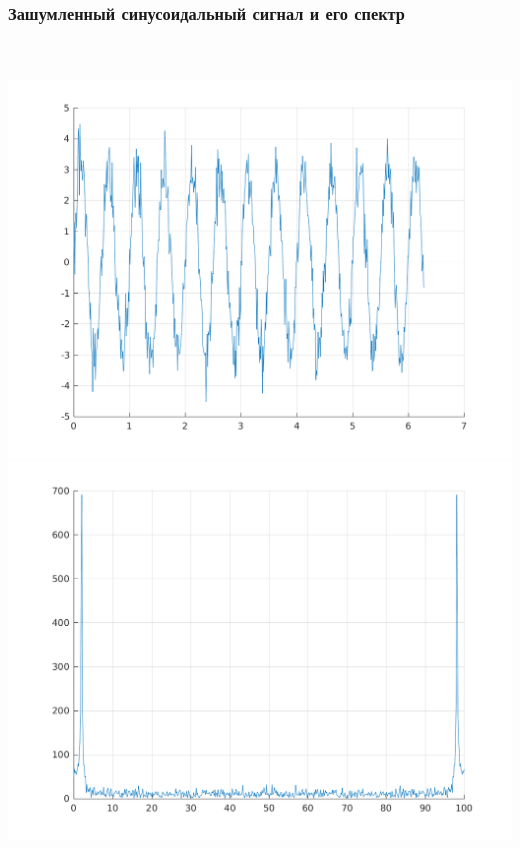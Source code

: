 \documentclass[a4paper]{article}
\begin{document}
\subsubsection{Зашумленный синусоидальный сигнал и его спектр}\\
\\
\includegraphics[scale=0.7]{lab3/figures/figure_2.png}\\
\includegraphics[scale=0.7]{lab3/figures/figure_3.png}\\
\end{document}
